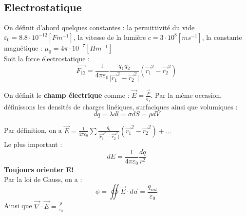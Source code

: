 \documentclass[../main.tex]{subfiles}
\begin{document}
\subsection{Electrostatique}
On définit d'abord quelques constantes : la permittivité du vide $\varepsilon_0 = 8.8\cdot 10^{-12} [Fm^{-1}]$, la vitesse de la lumière $c = 3\cdot 10^8 [ms^{-1}]$, la constante magnétique : $\mu_0 = 4\pi \cdot 10^{-7}[Hm^{-1}]$\\

Soit la force électrostatique :\\
\begin{equation}
    \vec{F_{12}} = \frac{1}{4\pi \varepsilon_0} \frac{q_1 q_2}{\lvert \vec{r_1}^2-\vec{r_2}^2\rvert} (\vec{r_1}^2-\vec{r_2}^2)
\end{equation}

On définit le \textbf{champ électrique} comme : $\vec{E} = \frac{\vec{F}}{q_1}$. Par la même occasion, définissons les densités de charges linéiques, surfaciques ainsi que volumiques :\\
\begin{equation}
    dq = \lambda dl = \sigma dS = \rho dV
\end{equation}

Par définition, on a $\vec{E} = \frac{1}{4\pi \varepsilon_0} \sum \frac{q_i}{\lvert \vec{r_1}^2-\vec{r_2}^2\rvert} (\vec{r_1}^2-\vec{r_2}^2) + \dots$\\

Le plus important : \\
\begin{equation}
    dE = \frac{1}{4\pi \varepsilon_0} \frac{dq}{r^2}
\end{equation}
\warning \textbf{Toujours orienter E!}\\

Par la loi de Gauss, on a : \\
\begin{equation}
    \phi = \oiint \vec{E}\cdot d\vec{a} = \frac{q_{int}}{\varepsilon_0}
\end{equation}
Ainsi que $\vec{\nabla} \cdot \vec{E} = \frac{\rho }{\varepsilon_0}$\\
\end{document}
